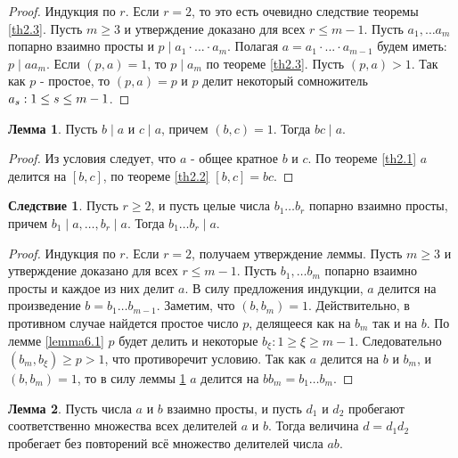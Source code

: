 \documentclass[a4paper, 12pt]{article}
\renewcommand{\div}{\mid}
\theoremstyle{definition}
\newtheorem*{consequense}{Следствие}
\newtheorem{lemma}{Лемма}[section]
\begin{document}
    \begin{proof}
        Индукция по $r$. Если $r=2$, то это есть очевидно следствие теоремы \ref{th2.3}. Пусть $m\geq 3$ и утверждение доказано для всех $r\leq m-1$. Пусть $a_1,\dots a_m$ попарно взаимно просты и $p \div a_1\cdot...\cdot a_m$. Полагая $a=a_1\cdot ... \cdot a_{m-1}$ будем иметь: $p \div aa_m$. Если $(p,a)=1$, то $p\div a_m$ по теореме \ref{th2.3}. Пусть $(p,a)>1$. Так как $p$ - простое, то $(p,a)=p$ и $p$ делит некоторый сомножитель $a_{s}:\\ 1 \leq s \leq m-1$.
    \end{proof} 
    \begin{lemma} \label{lemma6.2}
        Пусть $b\div a$ и $c\div a$, причем $(b,c)=1$. Тогда $bc\div a$.
    \end{lemma}
    \begin{proof}
        Из условия следует, что $a$ - общее кратное $b$ и $c$. По теореме \ref{th2.1} $a$ делится на $[b,c]$, по теореме \ref{th2.2} $[b,c]=bc$.
    \end{proof}
    \begin{consequense}
        Пусть $r\geq 2$, и пусть целые числа $b_1\dots b_r$ попарно взаимно просты, причем $b_1 \div a, \dots, b_r \div a$. Тогда $b_1\dots b_r \div a$.
    \end{consequense} 
    \begin{proof}
        Индукция по $r$. Если $r=2$, получаем утверждение леммы. Пусть $m\geq 3$ и утверждение доказано для всех $r\leq m-1$. Пусть $b_1, \dots b_m$ попарно взаимно просты и каждое из них делит $a$. В силу предложения индукции, $a$ делится на произведение $b = b_1\dots b_{m-1}$. Заметим, что $(b,b_m)=1$. Действительно, в противном случае найдется простое число $p$, делящееся как на $b_m$ так и на $b$. По лемме \ref{lemma6.1} $p$ будет делить и некоторые $b_{\xi}: 1\geq \xi \geq m-1$. Следовательно $(b_m,b_{\xi})\geq p>1$, что противоречит условию. Так как $a$ делится на $b$ и $b_m$, и $(b, b_m)=1$, то в силу леммы \ref{lemma6.2} $a$ делится на $bb_m=b_1\dots b_m$.
    \end{proof}
    \begin{lemma} \label{lemma6.3}
        Пусть числа $a$ и $b$ взаимно просты, и пусть $d_1$ и $d_2$ пробегают соответственно множества всех делителей $a$ и $b$. Тогда величина $d=d_1d_2$ пробегает без повторений всё множество делителей числа $ab$.
    \end{lemma} 
\end{document}
